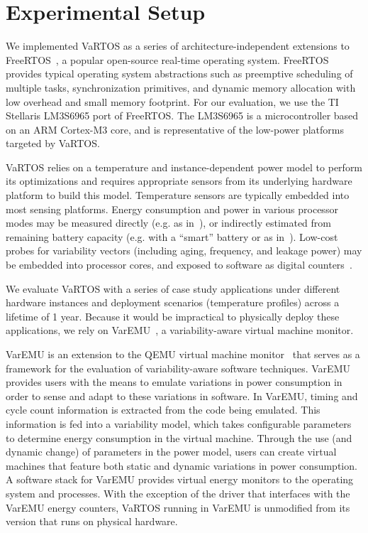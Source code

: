 \section{Experimental Setup}
\label{sec:methods}

We implemented VaRTOS as a series of architecture-independent extensions to FreeRTOS~\cite{freertos}, a popular open-source real-time operating system. FreeRTOS provides typical operating system abstractions such as preemptive scheduling of multiple tasks, synchronization primitives, and dynamic memory allocation with low overhead and small memory footprint. For our evaluation, we use the TI Stellaris LM3S6965 port of FreeRTOS. The LM3S6965 is a microcontroller based on an ARM Cortex-M3 core, and is representative of the low-power platforms targeted by VaRTOS.

VaRTOS relies on a temperature and instance-dependent power model to perform its optimizations and requires appropriate sensors from its underlying hardware platform to build this model. Temperature sensors are typically embedded into most sensing platforms. Energy consumption and power in various processor modes may be measured directly (e.g. as in~\cite{leap}), or indirectly estimated from remaining battery capacity (e.g. with a ``smart'' battery or as in~\cite{Lachenmann}). Low-cost probes for variability vectors (including aging, frequency, and leakage power) may be embedded into processor cores, and exposed to software as digital counters~\cite{Chan:2012}. 

We evaluate VaRTOS with a series of case study applications under different hardware instances and deployment scenarios (temperature profiles) across a lifetime of 1 year. Because it would be impractical to physically deploy these applications, we rely on VarEMU~\cite{varemu}, a variability-aware virtual machine monitor.

VarEMU is an extension to the QEMU virtual machine monitor~\cite{qemu} that serves as a framework for the evaluation of variability-aware software techniques. VarEMU provides users with the means to emulate variations in power consumption in order to sense and adapt to these variations in software. In VarEMU, timing and cycle count information is extracted from the code being emulated. This information is fed into a variability model, which takes configurable parameters to determine energy consumption in the virtual machine. Through the use (and dynamic change) of parameters in the power model, users can create virtual machines that feature both static and dynamic variations in power consumption. A software stack for VarEMU provides virtual energy monitors to the operating system and processes. With the exception of the driver that interfaces with the VarEMU energy counters, VaRTOS running in VarEMU is unmodified from its version that runs on physical hardware.  

